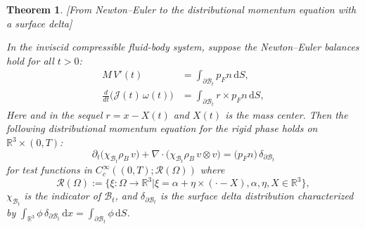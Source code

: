 \documentclass[11pt,twoside,reqno]{amsart}
\numberwithin{equation}{section}
\numberwithin{figure}{section}
\newtheorem{theorem}{Theorem}[section]
\begin{document}
\begin{theorem}\label{thm:ApendixA}[From Newton--Euler to the distributional momentum equation with a surface delta]

In the inviscid compressible fluid-body system, suppose the Newton--Euler balances hold for all $t>0$:
\begin{align}
M\,{V}'(t) &= \int_{\partial\mathcal{B}_t}  p_Fn \, \mathrm{d}S, \label{NE-lin}\\
\frac{d}{dt}\big(\mathcal J(t)\,\omega(t)\big)
&= \int_{\partial\mathcal{B}_t} r \times p_Fn \, \mathrm{d}S, \label{NE-ang}
\end{align}
Here and in the sequel $r=x-X(t)$ and $X(t)$ is the mass center. Then the following \emph{distributional} momentum equation for the rigid phase holds on $\mathbb R^3\times(0,T)$:
\begin{equation}
\partial_t\big(\chi_{\mathcal{B}_t}\rho_B\, v\big)+\nabla\!\cdot\!\big(\chi_{\mathcal{B}_t}\rho_B\, v\otimes v\big)
= \big( p_Fn\big)\,\delta_{\partial\mathcal{B}_t}
\label{PDE-delta}
\end{equation}
for test functions in $C_c^\infty((0,T);\mathcal{R}(\Omega))$ where  
\begin{equation}
    \mathcal{R}(\Omega):=\{\xi:\Omega\to\mathbb{R}^3 \big| \xi=\alpha+\eta\times(\cdot-X), \alpha,\eta,X\in \mathbb{R}^3 \},
\end{equation}
$\chi_{\mathcal{B}_t}$ is the indicator of $\mathcal B_t$, and $\delta_{\partial\mathcal{B}_t}$ is the surface delta distribution
characterized by $\int_{\mathbb R^3}\phi\,\delta_{\partial\mathcal{B}_t}\,\mathrm{d}x=\int_{\partial\mathcal{B}_t}\phi\,\mathrm{d}S$.
\end{theorem}
\end{document}
